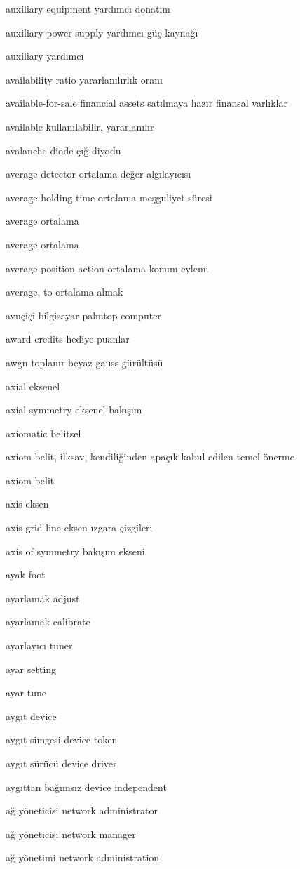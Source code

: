 \documentclass[12pt,fleqn]{article}\usepackage{../../common}
\begin{document}
auxiliary equipment yardımcı donatım

auxiliary power supply yardımcı güç kaynağı

auxiliary yardımcı

availability ratio yararlanılırlık oranı

available-for-sale financial assets satılmaya hazır finansal varlıklar

available kullanılabilir, yararlanılır

avalanche diode çığ diyodu

average detector ortalama değer algılayıcısı

average holding time ortalama meşguliyet süresi

average ortalama

average ortalama

average-position action ortalama konum eylemi

average, to ortalama almak

avuçiçi bilgisayar palmtop computer

award credits hediye puanlar

awgn toplanır beyaz gauss gürültüsü

axial eksenel

axial symmetry eksenel bakışım

axiomatic belitsel

axiom belit, ilksav, kendiliğinden apaçık kabul edilen temel önerme

axiom belit

axis eksen

axis grid line eksen ızgara çizgileri

axis of symmetry bakışım ekseni

ayak foot

ayarlamak adjust

ayarlamak calibrate

ayarlayıcı tuner

ayar setting

ayar tune

aygıt device

aygıt simgesi device token

aygıt sürücü device driver

aygıttan bağımsız device independent

ağ yöneticisi network administrator

ağ yöneticisi network manager

ağ yönetimi network administration
\end{document}
